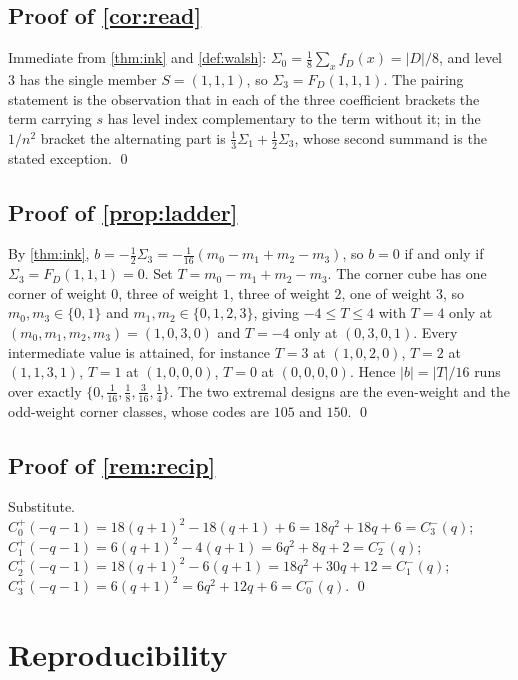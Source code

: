 \documentclass[11pt]{amsart}
\theoremstyle{definition}
\theoremstyle{remark}
\begin{document}
\subsection*{Proof of \cref{cor:read}}

Immediate from \cref{thm:ink} and \cref{def:walsh}: $\Sigma_0 = \tfrac18\sum_x f_D(x) = |D|/8$, and level $3$ has the single member $S = (1,1,1)$, so $\Sigma_3 = F_D(1,1,1)$. The pairing statement is the observation that in each of the three coefficient brackets the term carrying $s$ has level index complementary to the term without it; in the $1/n^2$ bracket the alternating part is $\tfrac13\Sigma_1 + \tfrac12\Sigma_3$, whose second summand is the stated exception. \qed

\subsection*{Proof of \cref{prop:ladder}}

By \cref{thm:ink}, $b = -\tfrac12\Sigma_3 = -\tfrac1{16}(m_0-m_1+m_2-m_3)$, so $b = 0$ if and only if $\Sigma_3 = F_D(1,1,1) = 0$. Set $T = m_0 - m_1 + m_2 - m_3$. The corner cube has one corner of weight $0$, three of weight $1$, three of weight $2$, one of weight $3$, so $m_0, m_3 \in \{0,1\}$ and $m_1, m_2 \in \{0,1,2,3\}$, giving $-4 \le T \le 4$ with $T = 4$ only at $(m_0,m_1,m_2,m_3) = (1,0,3,0)$ and $T = -4$ only at $(0,3,0,1)$. Every intermediate value is attained, for instance $T = 3$ at $(1,0,2,0)$, $T=2$ at $(1,1,3,1)$, $T=1$ at $(1,0,0,0)$, $T=0$ at $(0,0,0,0)$. Hence $|b| = |T|/16$ runs over exactly $\{0,\tfrac1{16},\tfrac18,\tfrac3{16},\tfrac14\}$. The two extremal designs are the even-weight and the odd-weight corner classes, whose codes are $105$ and $150$. \qed

\subsection*{Proof of \cref{rem:recip}}

Substitute. $C^{+}_0(-q-1) = 18(q+1)^2-18(q+1)+6 = 18q^2+18q+6 = C^{-}_3(q)$; $C^{+}_1(-q-1) = 6(q+1)^2-4(q+1) = 6q^2+8q+2 = C^{-}_2(q)$; $C^{+}_2(-q-1) = 18(q+1)^2-6(q+1) = 18q^2+30q+12 = C^{-}_1(q)$; $C^{+}_3(-q-1) = 6(q+1)^2 = 6q^2+12q+6 = C^{-}_0(q)$. \qed

\section{Reproducibility}
\label{sec:repro}
\end{document}
